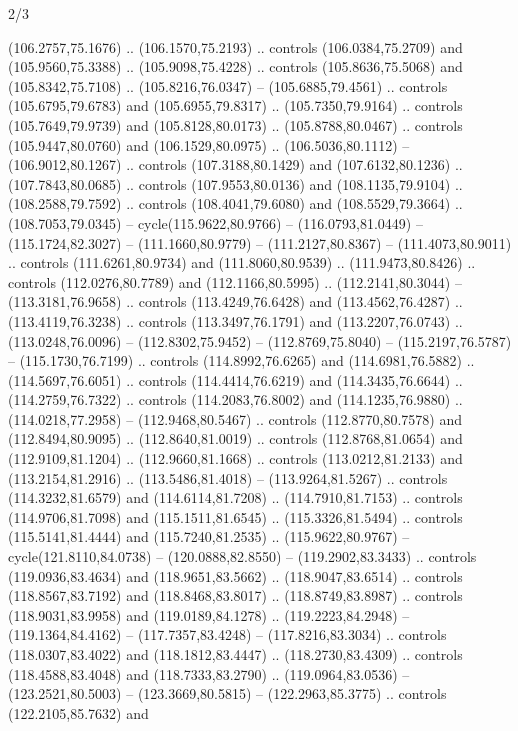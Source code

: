 \begin{flagdescription}{2/3}
\begin{scope}[scale=0.00214\flagwidth,yshift=164.5mm]
\begin{scope}[y=-0.8pt, x=0.8pt, inner sep=0pt, outer sep=0pt]
\begin{scope}[fill=black]
  (106.2757,75.1676) .. (106.1570,75.2193) .. controls (106.0384,75.2709) and
  (105.9560,75.3388) .. (105.9098,75.4228) .. controls (105.8636,75.5068) and
  (105.8342,75.7108) .. (105.8216,76.0347) -- (105.6885,79.4561) .. controls
  (105.6795,79.6783) and (105.6955,79.8317) .. (105.7350,79.9164) .. controls
  (105.7649,79.9739) and (105.8128,80.0173) .. (105.8788,80.0467) .. controls
  (105.9447,80.0760) and (106.1529,80.0975) .. (106.5036,80.1112) --
  (106.9012,80.1267) .. controls (107.3188,80.1429) and (107.6132,80.1236) ..
  (107.7843,80.0685) .. controls (107.9553,80.0136) and (108.1135,79.9104) ..
  (108.2588,79.7592) .. controls (108.4041,79.6080) and (108.5529,79.3664) ..
  (108.7053,79.0345) -- cycle(115.9622,80.9766) -- (116.0793,81.0449) --
  (115.1724,82.3027) -- (111.1660,80.9779) -- (111.2127,80.8367) --
  (111.4073,80.9011) .. controls (111.6261,80.9734) and (111.8060,80.9539) ..
  (111.9473,80.8426) .. controls (112.0276,80.7789) and (112.1166,80.5995) ..
  (112.2141,80.3044) -- (113.3181,76.9658) .. controls (113.4249,76.6428) and
  (113.4562,76.4287) .. (113.4119,76.3238) .. controls (113.3497,76.1791) and
  (113.2207,76.0743) .. (113.0248,76.0096) -- (112.8302,75.9452) --
  (112.8769,75.8040) -- (115.2197,76.5787) -- (115.1730,76.7199) .. controls
  (114.8992,76.6265) and (114.6981,76.5882) .. (114.5697,76.6051) .. controls
  (114.4414,76.6219) and (114.3435,76.6644) .. (114.2759,76.7322) .. controls
  (114.2083,76.8002) and (114.1235,76.9880) .. (114.0218,77.2958) --
  (112.9468,80.5467) .. controls (112.8770,80.7578) and (112.8494,80.9095) ..
  (112.8640,81.0019) .. controls (112.8768,81.0654) and (112.9109,81.1204) ..
  (112.9660,81.1668) .. controls (113.0212,81.2133) and (113.2154,81.2916) ..
  (113.5486,81.4018) -- (113.9264,81.5267) .. controls (114.3232,81.6579) and
  (114.6114,81.7208) .. (114.7910,81.7153) .. controls (114.9706,81.7098) and
  (115.1511,81.6545) .. (115.3326,81.5494) .. controls (115.5141,81.4444) and
  (115.7240,81.2535) .. (115.9622,80.9767) -- cycle(121.8110,84.0738) --
  (120.0888,82.8550) -- (119.2902,83.3433) .. controls (119.0936,83.4634) and
  (118.9651,83.5662) .. (118.9047,83.6514) .. controls (118.8567,83.7192) and
  (118.8468,83.8017) .. (118.8749,83.8987) .. controls (118.9031,83.9958) and
  (119.0189,84.1278) .. (119.2223,84.2948) -- (119.1364,84.4162) --
  (117.7357,83.4248) -- (117.8216,83.3034) .. controls (118.0307,83.4022) and
  (118.1812,83.4447) .. (118.2730,83.4309) .. controls (118.4588,83.4048) and
  (118.7333,83.2790) .. (119.0964,83.0536) -- (123.2521,80.5003) --
  (123.3669,80.5815) -- (122.2963,85.3775) .. controls (122.2105,85.7632) and

\end{scope}
\end{scope}
\end{scope}
\end{flagdescription}

